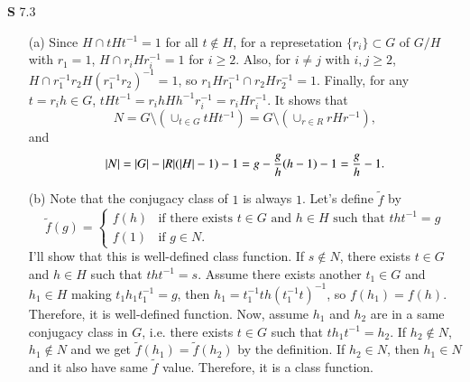 \documentclass[a4paper, 12pt]{article}
\theoremstyle{Mydefinition}
\theoremstyle{Mytheorem}
\begin{document}
\noindent \textbf{S} 7.3
\begin{enumerate}
    \item[(a)] Since $H\cap tHt^{-1} = 1$ for all $t\not\in H$, for a represetation $\{r_i\}\subset G$ of $G/H$ with $r_1 = 1$, $H\cap r_iHr_i^{-1} = 1$ for $i\geq 2$. Also, for $i\neq j$ with $i,j\geq 2$, $H\cap r_1^{-1}r_2H(r_1^{-1}r_2)^{-1} = 1$, so $r_1Hr_1^{-1}\cap r_2Hr_2^{-1} = 1$. Finally, for any $t = r_ih\in G$, $tHt^{-1} = r_ihHh^{-1}r_i^{-1} = r_iHr_i^{-1}$. It shows that
    \begin{equation}
        N = G\setminus\left(\cup_{t\in G}tHt^{-1}\right) = G\setminus\left(\cup_{r\in R}rHr^{-1}\right),
    \end{equation}
    and
    \begin{equation}
        \abs{N} = \abs{G}-\abs{R}(\abs{H}-1)-1 = g-\frac{g}{h}(h-1)-1 = \frac{g}{h}-1.
    \end{equation}
    \item[(b)] Note that the conjugacy class of $1$ is always $1$. Let's define $\tilde{f}$ by
    \begin{equation}
        \tilde{f}(g) = \begin{cases}
        f(h) & \textrm{if there exists $t\in G$ and $h\in H$ such that } tht^{-1} = g\\
        f(1) & \textrm{if $g\in N$}.
        \end{cases}
    \end{equation}
    I'll show that this is well-defined class function. If $s\not\in N$, there exists $t\in G$ and $h\in H$ such that $tht^{-1} = s$. Assume there exists another $t_1\in G$ and $h_1\in H$ making $t_1h_1t_1^{-1} = g$, then $h_1 = t_1^{-1}th(t_1^{-1}t)^{-1}$, so $f(h_1) = f(h)$. Therefore, it is well-defined function. Now, assume $h_1$ and $h_2$ are in a same conjugacy class in $G$, i.e. there exists $t\in G$ such that $th_1t^{-1} = h_2$. If $h_2\not\in N$, $h_1\not\in N$ and we get $\tilde{f}(h_1)=\tilde{f}(h_2)$ by the definition. If $h_2\in N$, then $h_1\in N$ and it also have same $\tilde{f}$ value. Therefore, it is a class function.
    

\end{enumerate}
\end{document}
